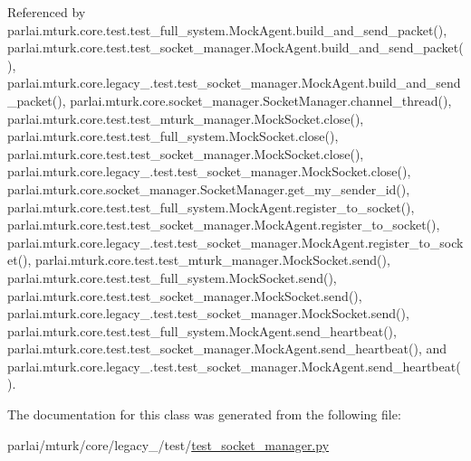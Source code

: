Referenced by parlai.\+mturk.\+core.\+test.\+test\+\_\+full\+\_\+system.\+Mock\+Agent.\+build\+\_\+and\+\_\+send\+\_\+packet(), parlai.\+mturk.\+core.\+test.\+test\+\_\+socket\+\_\+manager.\+Mock\+Agent.\+build\+\_\+and\+\_\+send\+\_\+packet(), parlai.\+mturk.\+core.\+legacy\+\_.\+test.\+test\+\_\+socket\+\_\+manager.\+Mock\+Agent.\+build\+\_\+and\+\_\+send\+\_\+packet(), parlai.\+mturk.\+core.\+socket\+\_\+manager.\+Socket\+Manager.\+channel\+\_\+thread(), parlai.\+mturk.\+core.\+test.\+test\+\_\+mturk\+\_\+manager.\+Mock\+Socket.\+close(), parlai.\+mturk.\+core.\+test.\+test\+\_\+full\+\_\+system.\+Mock\+Socket.\+close(), parlai.\+mturk.\+core.\+test.\+test\+\_\+socket\+\_\+manager.\+Mock\+Socket.\+close(), parlai.\+mturk.\+core.\+legacy\+\_.\+test.\+test\+\_\+socket\+\_\+manager.\+Mock\+Socket.\+close(), parlai.\+mturk.\+core.\+socket\+\_\+manager.\+Socket\+Manager.\+get\+\_\+my\+\_\+sender\+\_\+id(), parlai.\+mturk.\+core.\+test.\+test\+\_\+full\+\_\+system.\+Mock\+Agent.\+register\+\_\+to\+\_\+socket(), parlai.\+mturk.\+core.\+test.\+test\+\_\+socket\+\_\+manager.\+Mock\+Agent.\+register\+\_\+to\+\_\+socket(), parlai.\+mturk.\+core.\+legacy\+\_.\+test.\+test\+\_\+socket\+\_\+manager.\+Mock\+Agent.\+register\+\_\+to\+\_\+socket(), parlai.\+mturk.\+core.\+test.\+test\+\_\+mturk\+\_\+manager.\+Mock\+Socket.\+send(), parlai.\+mturk.\+core.\+test.\+test\+\_\+full\+\_\+system.\+Mock\+Socket.\+send(), parlai.\+mturk.\+core.\+test.\+test\+\_\+socket\+\_\+manager.\+Mock\+Socket.\+send(), parlai.\+mturk.\+core.\+legacy\+\_.\+test.\+test\+\_\+socket\+\_\+manager.\+Mock\+Socket.\+send(), parlai.\+mturk.\+core.\+test.\+test\+\_\+full\+\_\+system.\+Mock\+Agent.\+send\+\_\+heartbeat(), parlai.\+mturk.\+core.\+test.\+test\+\_\+socket\+\_\+manager.\+Mock\+Agent.\+send\+\_\+heartbeat(), and parlai.\+mturk.\+core.\+legacy\+\_.\+test.\+test\+\_\+socket\+\_\+manager.\+Mock\+Agent.\+send\+\_\+heartbeat().



The documentation for this class was generated from the following file\+:\begin{DoxyCompactItemize}
\item 
parlai/mturk/core/legacy\+\_/test/\hyperlink{legacy__2018_2test_2test__socket__manager_8py}{test\+\_\+socket\+\_\+manager.\+py}\end{DoxyCompactItemize}
